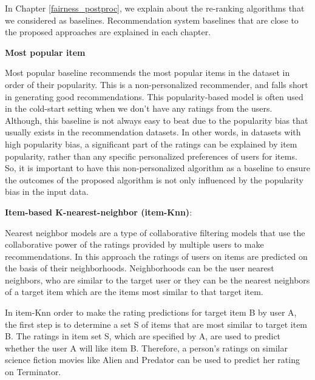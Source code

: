         In Chapter \ref{fairness_postproc}, we explain about the re-ranking algorithms that we considered as baselines. Recommendation system baselines that are close to the proposed approaches are explained in each chapter.
        
        
        \textbf{Most popular item}
        
        Most popular baseline recommends the most popular items in the dataset in order of their popularity. This is a non-personalized recommender, and falls short in generating good recommendations. This popularity-based model is often used in the cold-start setting when we don't have any ratings from the users. Although, this baseline is not always easy to beat due to the popularity bias that usually exists in the recommendation datasets. In other words, in datasets with high popularity bias, a significant part of the ratings can be explained by item popularity, rather than any specific personalized preferences of users for items. So, it is important to have this non-personalized algorithm as a baseline to ensure the outcomes of the proposed algorithm is not only influenced by the popularity bias in the input data.
        
        
        \textbf{Item-based K-nearest-neighbor (item-Knn)}: 
        
        Nearest neighbor models are a type of collaborative filtering models that use the collaborative power of the ratings provided by multiple users to make recommendations. In this approach the ratings of users on items are predicted on the basis of their neighborhoods. Neighborhoods can be the user nearest neighbors, who are similar to the target user or they can be the nearest neighbors of a target item which are the items most similar to that target item.
        
        In item-Knn order to make the rating predictions for target item B by user A, the first step is to determine a set S of items that are most similar to target item B. The ratings in item set S, which are specified by A, are used to predict whether the user A will like item B. Therefore, a person's ratings on similar science fiction movies like Alien and Predator can be used to predict her rating on Terminator.
    
        
